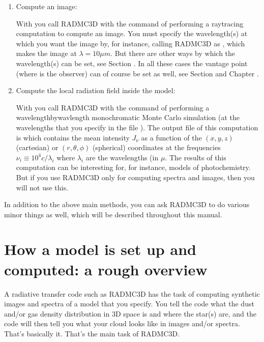 \documentclass[letterpaper,10pt,english]{sphinxmanual}
\begin{document}
\begin{enumerate}
\item {} 
Compute an image:

With  you call RADMC\sphinxhyphen{}3D with the command of performing a
ray\sphinxhyphen{}tracing computation to compute an image. You must specify the
wavelength(s) at which you want the image by, for instance, calling RADMC\sphinxhyphen{}3D
as , which makes the image at \(\lambda=10\mu
m\). But there are other ways by which the wavelength(s) can be set, see
Section {\hyperref[\detokenize{imagesspectra:sec-set-camera-frequencies}]{}}.  In all these cases the vantage
point (where is the observer) can of course be set as well, see Section
{\hyperref[\detokenize{dustradtrans:sec-dust-ray-tracing}]{}} and Chapter {\hyperref[\detokenize{imagesspectra:chap-images-spectra}]{}}.

\item {} 
Compute the local radiation field inside the model:

With  you call RADMC\sphinxhyphen{}3D with the command of performing a
wavelength\sphinxhyphen{}by\sphinxhyphen{}wavlength monochromatic Monte Carlo simulation (at the
wavelengths that you specify in the file
). The output file of this computation is
 which contains the mean intensity \(J_\nu\) as a
function of the \((x,y,z)\) (cartesian) or \((r,\theta,\phi)\)
(spherical) coordinates at the frequencies \(\nu_i\equiv
10^4c/\lambda_i\) where \(\lambda_i\) are the wavelengths (in
\(\mu\). The
results of this computation can be interesting for, for instance, models of
photochemistry. But if you use RADMC\sphinxhyphen{}3D only for computing spectra and
images, then you will not use this.

\end{enumerate}

In addition to the above main methods, you can ask RADMC\sphinxhyphen{}3D to do various minor
things as well, which will be described throughout this manual.


\section{How a model is set up and computed: a rough overview}
\label{\detokenize{basicstructure:how-a-model-is-set-up-and-computed-a-rough-overview}}
A radiative transfer code such as RADMC\sphinxhyphen{}3D has the task of computing synthetic
images and spectra of a model that you specify. You tell the code what the dust
and/or gas density distribution in 3\sphinxhyphen{}D space is and where the star(s) are, and
the code will then tell you what your cloud looks like in images and/or
spectra. That’s basically it. That’s the main task of RADMC\sphinxhyphen{}3D.
\end{document}
